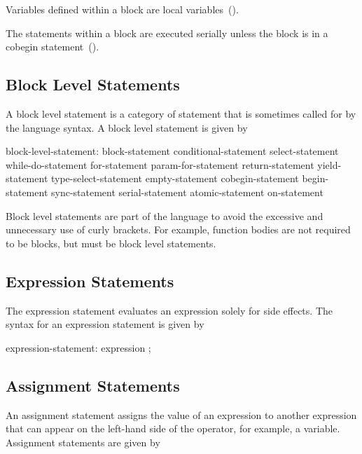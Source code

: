 Variables defined within a block are local
variables~().

The statements within a block are executed serially unless the block
is in a cobegin statement~().

\subsection{Block Level Statements}
\label{Block_Level_Statements}

A block level statement is a category of statement that is sometimes
called for by the language syntax. A block level statement is given by
\begin{syntax}
block-level-statement:
  block-statement
  conditional-statement
  select-statement
  while-do-statement
  for-statement
  param-for-statement
  return-statement
  yield-statement
  type-select-statement
  empty-statement
  cobegin-statement
  begin-statement
  sync-statement
  serial-statement
  atomic-statement
  on-statement
\end{syntax}

Block level statements are part of the language to avoid the excessive
and unnecessary use of curly brackets.  For example, function bodies
are not required to be blocks, but must be block level statements.

\subsection{Expression Statements}
\label{Expression_Statements}

The expression statement evaluates an expression solely for side
effects. The syntax for an expression statement is given by
\begin{syntax}
expression-statement:
  expression ;
\end{syntax}

\subsection{Assignment Statements}
\label{Assignment_Statements}

An assignment statement assigns the value of an expression to another
expression that can appear on the left-hand side of the operator, for
example, a variable.  Assignment statements are given by


